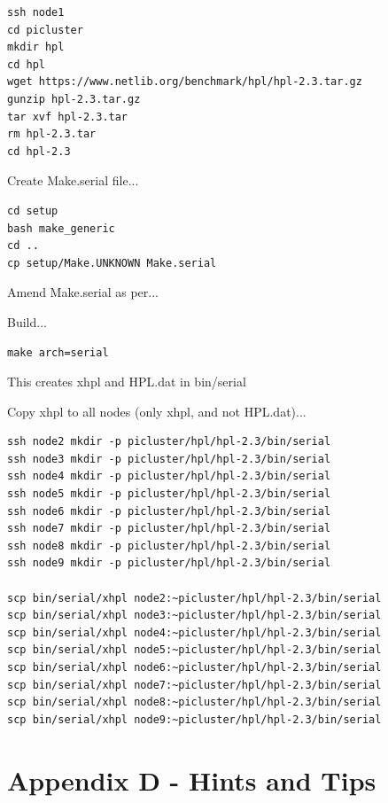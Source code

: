 \documentclass{article}
\begin{document}
\begin{lstlisting}[frame=single]
ssh node1
cd picluster
mkdir hpl
cd hpl
wget https://www.netlib.org/benchmark/hpl/hpl-2.3.tar.gz
gunzip hpl-2.3.tar.gz
tar xvf hpl-2.3.tar
rm hpl-2.3.tar
cd hpl-2.3
\end{lstlisting}

Create Make.serial file...

\begin{lstlisting}[frame=single]
cd setup
bash make_generic
cd ..
cp setup/Make.UNKNOWN Make.serial
\end{lstlisting}

Amend Make.serial as per...

Build...

\begin{lstlisting}[frame=single]
make arch=serial   
\end{lstlisting}

This creates xhpl and HPL.dat in bin/serial

Copy xhpl to all nodes (only xhpl, and not HPL.dat)...

\begin{lstlisting}[frame=single]
ssh node2 mkdir -p picluster/hpl/hpl-2.3/bin/serial
ssh node3 mkdir -p picluster/hpl/hpl-2.3/bin/serial
ssh node4 mkdir -p picluster/hpl/hpl-2.3/bin/serial
ssh node5 mkdir -p picluster/hpl/hpl-2.3/bin/serial
ssh node6 mkdir -p picluster/hpl/hpl-2.3/bin/serial
ssh node7 mkdir -p picluster/hpl/hpl-2.3/bin/serial
ssh node8 mkdir -p picluster/hpl/hpl-2.3/bin/serial
ssh node9 mkdir -p picluster/hpl/hpl-2.3/bin/serial

scp bin/serial/xhpl node2:~picluster/hpl/hpl-2.3/bin/serial
scp bin/serial/xhpl node3:~picluster/hpl/hpl-2.3/bin/serial
scp bin/serial/xhpl node4:~picluster/hpl/hpl-2.3/bin/serial
scp bin/serial/xhpl node5:~picluster/hpl/hpl-2.3/bin/serial
scp bin/serial/xhpl node6:~picluster/hpl/hpl-2.3/bin/serial
scp bin/serial/xhpl node7:~picluster/hpl/hpl-2.3/bin/serial
scp bin/serial/xhpl node8:~picluster/hpl/hpl-2.3/bin/serial
scp bin/serial/xhpl node9:~picluster/hpl/hpl-2.3/bin/serial
\end{lstlisting}



%
%
\clearpage\section{Appendix D - Hints and Tips}
\end{document}
